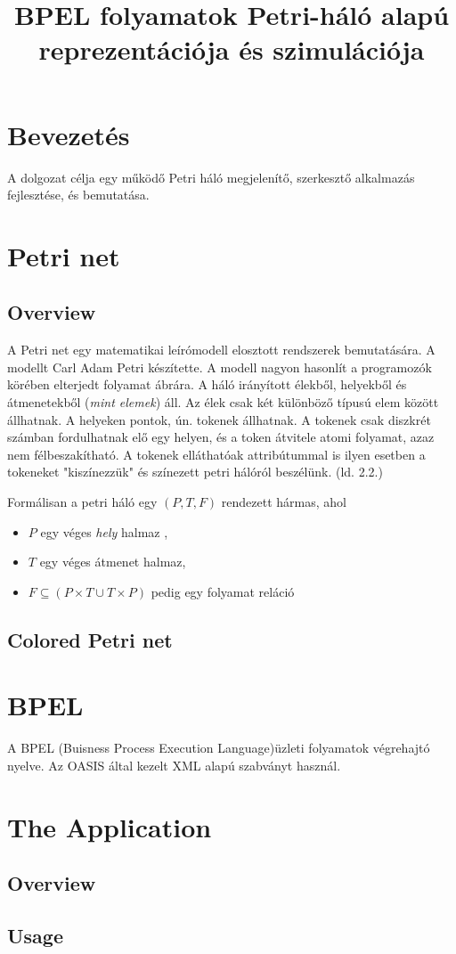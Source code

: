 \documentclass[12pt,a4paper]{article}
\date{\vspace{-5ex}}
\title{BPEL folyamatok Petri-háló alapú reprezentációja és szimulációja}
\begin{document}
\maketitle

\section{Bevezetés}

A dolgozat célja egy működő Petri háló  megjelenítő, szerkesztő %
alkalmazás fejlesztése, és bemutatása. %

\section{Petri net}

\subsection{Overview}

A Petri net egy matematikai leírómodell elosztott rendszerek bemutatására.
A modellt Carl Adam Petri készítette.
A modell nagyon hasonlít a programozók körében elterjedt folyamat ábrára.
A háló irányított élekből, helyekből és átmenetekből (\textsl{mint elemek}) áll.
Az élek csak két különböző típusú elem között állhatnak.
A helyeken pontok, ún. tokenek állhatnak.
A tokenek csak diszkrét számban fordulhatnak elő egy helyen, és a token átvitele atomi folyamat, azaz nem félbeszakítható.
A tokenek elláthatóak attribútummal is ilyen esetben a tokeneket "kiszínezzük" és színezett petri hálóról beszélünk. (ld. 2.2.) %

Formálisan  a petri háló egy \((P, T, F)\) rendezett hármas, ahol 
\begin{itemize}
\item $P$ egy véges \textsl{hely} halmaz ,
\item $T$ egy véges átmenet halmaz,
\item $F\subseteq (P\times T\cup T\times P)$ pedig egy folyamat reláció
\end{itemize}

\subsection{Colored Petri net}

\section{BPEL}

A BPEL (Buisness Process Execution Language)üzleti folyamatok végrehajtó nyelve.
Az OASIS által kezelt XML alapú szabványt használ. 

\section{The Application}

\subsection{Overview}

\subsection{Usage}
\end{document}
